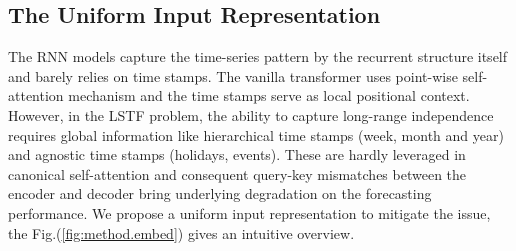 \documentclass[letterpaper]{article} %
\begin{document}
\begin{appendices}
\section{The Uniform Input Representation}
\label{sec:appendix.input}
The RNN models \cite{schuster1997bidirectional,hochreiter1997long,chung2014empirical,sutskever2014sequence,conf/ijcai/QinSCCJC17,chang2018memory} capture the time-series pattern by the recurrent structure itself and barely relies on time stamps. The vanilla transformer \cite{vaswani2017attention, devlin2018bert} uses point-wise self-attention mechanism and the time stamps serve as local positional context. However, in the LSTF problem, the ability to capture long-range independence requires global information like hierarchical time stamps (week, month and year) and agnostic time stamps (holidays, events). These are hardly leveraged in canonical self-attention and consequent query-key mismatches between the encoder and decoder bring underlying degradation on the forecasting performance. We propose a uniform input representation to mitigate the issue, the Fig.(\ref{fig:method.embed}) gives an intuitive overview.



\end{appendices}
\end{document}
